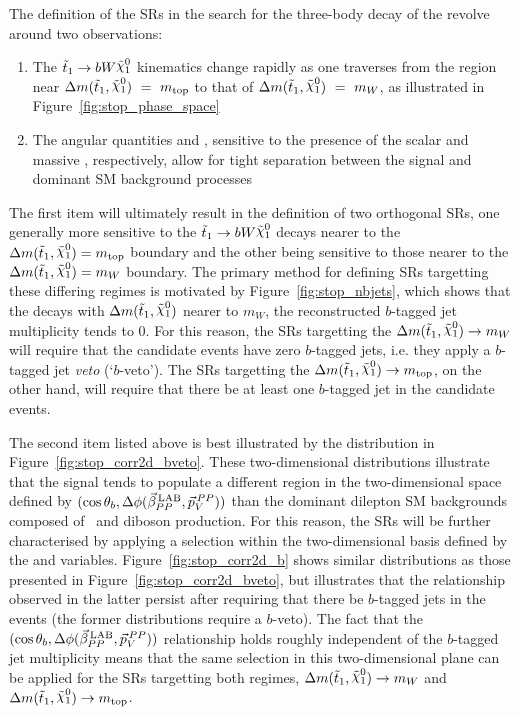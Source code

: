 The definition of the SRs in the search for the three-body decay of the \stopone revolve around
two observations:
\begin{enumerate}
    \item The $\stopone \rightarrow b W \ninoone$ kinematics change rapidly as one traverses from
        the region near $\sdiff~ = ~m_{\text{top}}$ to that of $\sdiff~ = ~m_W$,
        as illustrated in Figure~\ref{fig:stop_phase_space}
    \item The angular quantities \cosb and \dpb,  sensitive to the presence of the scalar \stopone and massive
        \ninoone, respectively, allow for tight separation between the \stopone signal and dominant
        SM background processes
\end{enumerate}
The first item will ultimately result in the definition of two orthogonal SRs, one generally
more sensitive to the $\bWN$ decays nearer to the $\sdiff = m_{\text{top}}$ boundary
and the other being sensitive to those nearer to the $\sdiff = m_W$ boundary.
The primary method for defining SRs targetting these differing regimes is motivated by Figure~\ref{fig:stop_nbjets},
which shows that the \bWN decays with $\sdiff$ nearer to $m_W$, the reconstructed $b$-tagged
jet multiplicity tends to 0.
For this reason, the SRs targetting the $\sdiff \rightarrow m_W$ will require that the
candidate events have zero $b$-tagged jets, i.e. they apply a $b$-tagged jet \textit{veto} (`$b$-veto').
The SRs targetting the $\sdiff \rightarrow m_{\text{top}}$, on the other hand, will
require that there be at least one $b$-tagged jet in the candidate events.

The second item listed above is best illustrated by the distribution in Figure~\ref{fig:stop_corr2d_bveto}.
These two-dimensional distributions illustrate that the \bWN signal tends to populate
a different region in the two-dimensional space defined by $(\cos\theta_b, \Delta \phi (\vec{\beta}_{PP}^{\,\text{LAB}}, \vec{p}_V^{\,PP}))$ than
the dominant dilepton SM backgrounds composed of \ttbar~and diboson production.
For this reason, the SRs will be further characterised by applying a selection within
the two-dimensional basis defined by the \cosb and \dpb variables.
Figure~\ref{fig:stop_corr2d_b} shows similar distributions as those presented in Figure~\ref{fig:stop_corr2d_bveto},
but illustrates that the relationship observed in the latter persist after
requiring that there be $b$-tagged jets in the events (the former distributions require a $b$-veto).
The fact that the $(\cos\theta_b, \Delta \phi (\vec{\beta}_{PP}^{\,\text{LAB}}, \vec{p}_V^{\,PP}))$ relationship holds roughly independent of the $b$-tagged
jet multiplicity means that the same selection in this two-dimensional plane
can be applied for the SRs targetting both \bWN regimes, $\sdiff \rightarrow m_W$ and
$\sdiff \rightarrow m_{\text{top}}$.


